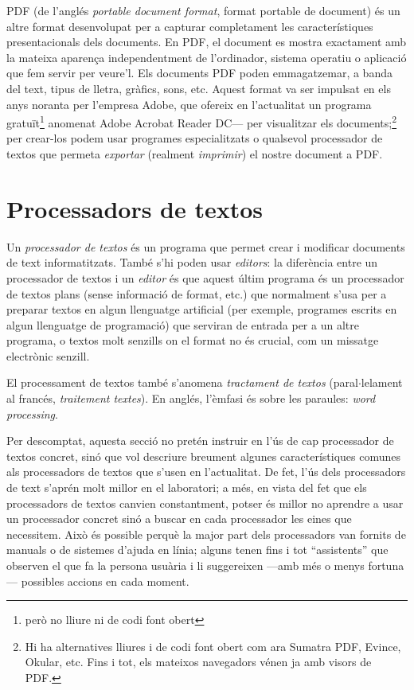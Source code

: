 PDF (de l'anglés \emph{portable document format}, format portable de
document) és un altre format desenvolupat per a capturar completament
les característiques presentacionals dels documents. En PDF, el
document es mostra exactament amb la mateixa aparença independentment
de l'ordinador, sistema operatiu o aplicació que fem servir per
veure'l. Els documents PDF poden emmagatzemar, a banda del text, tipus
de lletra, gràfics, sons, etc. Aquest format va ser impulsat en els
anys noranta per l'empresa Adobe, que ofereix en l'actualitat un
programa gratuït\footnote{però no lliure ni de codi font obert}
anomenat Adobe Acrobat Reader DC--- per visualitzar els
documents;\footnote{Hi ha alternatives lliures i de codi font obert
  com ara Sumatra PDF, Evince, Okular, etc. Fins i tot, els mateixos
  navegadors vénen ja amb visors de PDF.}  per crear-los podem usar
programes especialitzats o qualsevol processador de textos que permeta
\emph{exportar} (realment \emph{imprimir}) el nostre document a PDF.

\section{Processadors de textos}
\label{ss:proctext}

Un \emph{processador de textos} és un programa que permet crear i
modificar documents de text informatitzats. També s'hi poden usar {\em
  editors}: la diferència entre un processador de textos i un {\em
  editor} és que aquest últim programa és un processador de textos
plans (sense informació de format, etc.) que normalment s'usa per a
preparar textos en algun llenguatge artificial (per exemple, programes
escrits en algun llenguatge de programació) que serviran de entrada
per a un altre programa, o textos molt senzills on el format no és
crucial, com un missatge electrònic senzill.

El processament de textos també s'anomena \emph{tractament de
  textos} (paral$\cdot$le\-la\-ment al francés, \emph{traitement
  textes}). En anglés, l'èmfasi és sobre les paraules:
\emph{word processing}.

Per descomptat, aquesta secció no pretén instruir en l'ús de cap
processador de textos concret, sinó que vol descriure breument algunes
característiques comunes als processadors de textos que s'usen en
l'actualitat. De fet, l'ús dels processadors de text s'aprén molt
millor en el laboratori; a més, en vista del fet que els processadors
de textos canvien constantment, potser és millor no aprendre a usar un
processador concret sinó a buscar en cada processador les eines que
necessitem. Això és possible perquè la major part dels processadors
van fornits de manuals o de sistemes d'ajuda en línia; alguns tenen
fins i tot ``assistents'' que observen el que fa la persona usuària i
li suggereixen ---amb més o menys fortuna--- possibles accions en cada
moment.

